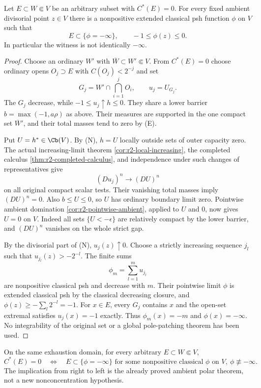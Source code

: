 \begin{theorem}
\label{thm:r2-capacity-zero-polar-witness}
Let $E\subset W\Subset V$ be an arbitrary subset with $C^*(E)=0$.
For every fixed ambient divisorial point $z\in V$ there is a nonpositive
extended classical psh function $\phi$ on $V$ such that
\[
 E\subset\{\phi=-\infty\},\qquad -1\leq\phi(z)\leq0.
\]
In particular the witness is not identically $-\infty$.
\end{theorem}

\begin{proof}
Choose an ordinary $W'$ with
$\overline W\subset W'\Subset V$. From $C^*(E)=0$ choose ordinary
opens $O_j\supset E$ with $C(O_j)<2^{-j}$ and set
\[
 G_j=W'\cap\bigcap_{i=1}^jO_i,\qquad u_j=U_{G_j}.
\]
The $G_j$ decrease, while $-1\leq u_j\uparrow h\leq0$.
They share a lower barrier $b=\max(-1,a\rho)$ as above.
Their measures are supported in the one compact set
$\overline W'$, and their total masses tend to zero by \textup{(E)}.

Put $U=h^*\in\Cb(V)$. By \textup{(N)}, $h=U$ locally outside
sets of outer capacity zero. The actual increasing-limit theorem
\ref{cor:r2-local-increasing}, the completed calculus
\ref{thm:r2-completed-calculus}, and independence under such changes
of representatives give
\[
 (Du_j)^n\longrightarrow(DU)^n
\]
on all original compact scalar tests. Their vanishing total masses
imply $(DU)^n=0$. Also $b\leq U\leq0$, so $U$ has ordinary
boundary limit zero. Pointwise ambient domination
\ref{cor:r2-pointwise-ambient}, applied to $U$ and $0$, now gives
$U=0$ on $V$. Indeed all sets $\{U<-\epsilon\}$ are relatively
compact by the lower barrier, and $(DU)^n$ vanishes on the whole
strict gap.

By the divisorial part of \textup{(N)}, $u_j(z)\uparrow0$.
Choose a strictly increasing sequence $j_l$ such that
$u_{j_l}(z)>-2^{-l}$. The finite sums
\[
 \phi_m=\sum_{l=1}^m u_{j_l}
\]
are nonpositive classical psh and decrease with $m$. Their pointwise
limit $\phi$ is extended classical psh by the classical decreasing
closure, and $\phi(z)\geq-\sum_l2^{-l}=-1$.
For $x\in E$, every $G_j$ contains $x$ and the open-set extremal
satisfies $u_j(x)=-1$ exactly. Thus $\phi_m(x)=-m$ and
$\phi(x)=-\infty$. No integrability of the original set or a
global pole-patching theorem has been used.
\end{proof}

\begin{corollary}
\label{cor:r2-local-polar-equivalence}
On the same exhaustion domain, for every arbitrary $E\subset W\Subset V$,
\[
 C^*(E)=0
 \quad\Longleftrightarrow\quad
 E\subset\{\phi=-\infty\}
 \text{ for some nonpositive classical }\phi\text{ on }V,
 \ \phi\not\equiv-\infty.
\]
The implication from right to left is the already proved ambient
polar theorem, not a new nonconcentration hypothesis.
\end{corollary}


